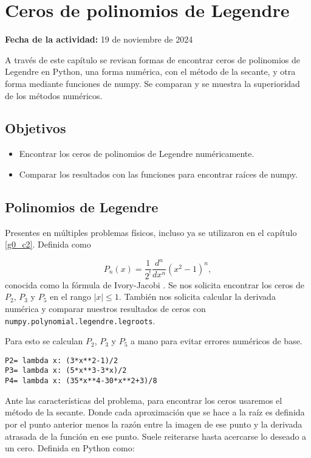 \documentclass[../portafolio.tex]{subfiles}
\begin{document}
\chapter{Ceros de polinomios de Legendre}
\label{g5_ej5}
\hfill \textbf{Fecha de la actividad:} 19 de noviembre de 2024

\medskip

A través de este capítulo se revisan formas de encontrar ceros de polinomios de Legendre en Python, una forma numérica, con el método de la secante, y otra forma mediante funciones de numpy. Se comparan y se muestra la superioridad de los métodos numéricos.

\section*{Objetivos}
\begin{itemize}
\item Encontrar los ceros de polinomios de Legendre numéricamente.
\item Comparar los resultados con las funciones para encontrar raíces de numpy.
\end{itemize}

\section{Polinomios de Legendre}
Presentes en múltiples problemas físicos, incluso ya se utilizaron en el capítulo \ref{g0_c2}. Definida como

\begin{equation}
P_n(x) = \frac{1}{2^ !} \frac{d^n}{dx^n} \left( x^2 - 1 \right)^n ,
\end{equation}
conocida como la fórmula de Ivory-Jacobi \citep{perez2021}.
Se nos solicita encontrar los ceros de $P_2$, $P_3$ y $P_5$ en el rango $|x|\leq 1$. También nos solicita calcular la derivada numérica y comparar nuestros resultados de ceros con \texttt{numpy.polynomial.legendre.legroots}.

Para esto se calculan $P_2$, $P_3$ y $P_5$ a mano para evitar errores numéricos de base.
\begin{verbatim}
P2= lambda x: (3*x**2-1)/2
P3= lambda x: (5*x**3-3*x)/2
P4= lambda x: (35*x**4-30*x**2+3)/8
\end{verbatim}

Ante las características del problema, para encontrar los ceros usaremos el método de la secante. Donde cada aproximación que se hace a la raíz es definida por el punto anterior menos la razón entre la imagen de ese punto y la derivada atrasada de la función en ese punto. Suele reiterarse hasta acercarse lo deseado a un cero. Definida en Python como:
\end{document}
